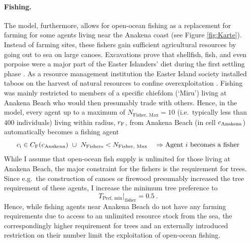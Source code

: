 \paragraph{Fishing.}
The model, furthermore, allows for open-ocean fishing as a replacement for farming for some agents living near the Anakena coast (see Figure \ref{fig:Karte}).
Instead of farming sites, these fishers gain sufficient agricultural resources by going out to sea on large canoes.
Excavations prove that shellfish, fish, and even porpoise were a major part of the Easter Islanders' diet during the first settling phase \citep{Bahn2017}.
As a resource management institution the Easter Island society installed taboos on the harvest of natural resources to confine overexploitation \citep{Good2006}. 
Fishing was mainly restricted to members of a specific chiefdom (`Miru') living at Anakena Beach \citep{Bahn2017} who would then presumably trade with others.
Hence, in the model, every agent up to a maximum of $N_\text{Fisher, Max} = 10$ (i.e.\ typically less than $400$ individuals) living within radius, $r_{\rm F}$, from Anakena Beach (in cell $c_{\rm Anakena}$) automatically becomes a fishing agent
\begin{equation}
 	c_{\rm i} \in C_{\rm F}(c_{\rm Anakena}) \  \cup \ N_\text{Fishers}<N_\text{Fisher, Max} \quad \Rightarrow \text{Agent }i\text{ becomes a fisher}
\end{equation}
While I assume that open-ocean fish supply is unlimited for those living at Anakena Beach, the major constraint for the fishers is the requirement for trees.
Since e.g.\ the construction of canoes or firewood presumably increased the tree requirement of these agents, I increase the minimum tree preference to
\begin{equation}
T_\text{Pref, min}|_\text{fisher} = 0.5 \ .
\end{equation} 
Hence, while fishing agents near Anakena Beach do not have any farming requirements due to access to an unlimited resource stock from the sea, the correspondingly higher requirement for trees and an externally introduced restriction on their number limit the exploitation of open-ocean fishing.

